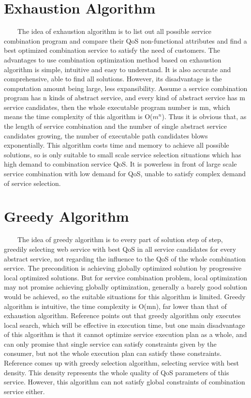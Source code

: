 \documentclass[senior,final,11pt]{iscs-thesis}
\begin{document}
\section{Exhaustion Algorithm}
~~~~The idea of exhaustion algorithm is to list out all possible service combination program and compare their QoS non-functional attributes and find a best optimized combination service to satisfy the need of customers. The advantages to use combination optimization method based on exhaustion algorithm is simple, intuitive and easy to understand. It is also accurate and comprehensive, able to find all solutions. However, its disadvantage is the computation amount being large, less expansibility.
Assume a service combination program has n kinds of abstract service, and every kind of abstract service has m service candidates, then the whole executable program number is mn, which means the time complexity of this algorithm is O($m^n$). Thus it is obvious that, as the length of service combination and the number of single abstract service candidates growing, the number of executable path candidates blows exponentially. This algorithm costs time and memory to achieve all possible solutions, so is only suitable to small scale service selection situations which has high demand to combination service QoS. It is powerless in front of large scale service combination with low demand for QoS, unable to satisfy complex demand of service selection.
\section{Greedy Algorithm}
~~~~The idea of greedy algorithm is to every part of solution step of step, greedily selecting web service with best QoS in all service candidates for every abstract service, not regarding the influence to the QoS of the whole combination service. The precondition is achieving globally optimized solution by progressive local optimized solutions. But for service combination problem, local optimization may not promise achieving globally optimization, generally a barely good solution would be achieved, so the suitable situations for this algorithm is limited. Greedy algorithm is intuitive, the time complexity is O(mn), far lower than that of exhaustion algorithm. Reference \cite{hofmann1999probabilistic} points out that greedy algorithm only executes local search, which will be effective in execution time, but one main disadvantage of this algorithm is that it cannot optimize service execution plan as a whole, and can only promise that single service can satisfy constraints given by the consumer, but not the whole execution plan can satisfy these constraints. Reference \cite{griffiths2004finding} comes up with greedy selection algorithm, selecting service with best density. This density represents the whole quality of QoS parameters of this service. However, this algorithm can not satisfy global constraints of combination service either.
\end{document}
